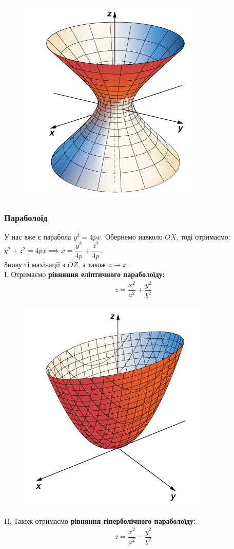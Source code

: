 \documentclass[a4paper, 10pt]{extarticle}
\theoremstyle{theoremdd}
\theoremstyle{theoremdd}
\theoremstyle{theoremdd}
\theoremstyle{theoremdd}
\theoremstyle{theoremdd}
\theoremstyle{theoremdd}
\theoremstyle{theoremdd}
\theoremstyle{theoremdd}
\begin{document}
\begin{figure}[H]
\centering
\includegraphics[scale=1]{1-shit-hyperboloid.jpeg}
\end{figure}

\subsubsection{Параболоїд}
У нас вже є парабола $y^2 = 4px$. Обернемо навколо $OX$, тоді отримаємо:\\
$y^2+z^2 = 4px \implies x = \dfrac{y^2}{4p} + \dfrac{z^2}{4p}$.\\
Знову ті махінації з $OZ$, а також $z \to x$.\\
I. Отримаємо \textbf{рівняння еліптичного параболоїду:}
\begin{align*}
z = \dfrac{x^2}{a^2} + \dfrac{y^2}{b^2}
\end{align*}
\begin{figure}[H]
\centering
\includegraphics[scale=1]{elliptic-paraboloid.jpeg}
\end{figure}
II. Також отримаємо \textbf{рівняння гіперболічного параболоїду:}
\begin{align*}
z = \dfrac{x^2}{a^2} - \dfrac{y^2}{b^2}
\end{align*}
\end{document}
